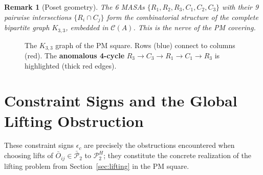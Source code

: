 \documentclass[11pt]{article}
\newtheorem{remark}[theorem]{Remark}
\begin{document}
\begin{remark}[Poset geometry]
The 6 MASAs $\{R_1, R_2, R_3, C_1, C_2, C_3\}$ with their 9
pairwise intersections $\{R_i \cap C_j\}$ form the combinatorial
structure of the complete bipartite graph $K_{3,3}$, embedded in
$\mathcal{C}(A)$. This is the nerve of the PM covering.
\end{remark}

\begin{figure}[h]
\centering
{}
\caption{The $K_{3,3}$ graph of the PM square. Rows (blue) connect to
columns (red). The \textbf{anomalous 4-cycle} $R_3 \to C_3 \to R_1 
\to C_1 \to R_3$ is highlighted (thick red edges).}
\label{fig:k33}
\end{figure}

\section{Constraint Signs and the Global Lifting Obstruction}
\label{sec:constraint}

These constraint signs $\epsilon_c$ are precisely the obstructions
encountered when choosing lifts of $\bar{O}_{ij} \in \bar{\mathcal{P}}_2$
to $\mathcal{P}_2^H$; they constitute the concrete realization of the
lifting problem from Section~\ref{sec:lifting} in the PM square.
\end{document}
